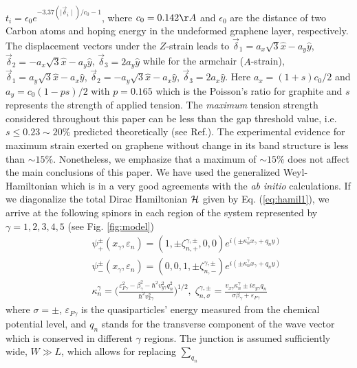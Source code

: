 \documentclass[doublecol]{epl2}
\begin{document}
$t_{i}=\epsilon_{0}e^{-3.37(\mid\vec{\delta}_{i}\mid)/c_{0}-1}$, where $c_0=0.142 {\AA}$ and $\epsilon_{0}$
are the distance of two Carbon atoms and hoping energy in the undeformed graphene layer, respectively. The
displacement vectors under the $Z$-strain leads to $\vec{\delta}_1=a_{x}\sqrt{3}\hat{x}-a_{y}\hat{y}$,
$\vec{\delta}_2=-a_{x}\sqrt{3}\hat{x}-a_{y}\hat{y}$, $\vec{\delta}_3=2a_{y}\hat{y}$ while for the armchair
($A$-strain), $\vec{\delta}_1=a_{y}\sqrt{3}\hat{x}-a_{x}\hat{y}$,
$\vec{\delta}_2=-a_{y}\sqrt{3}\hat{x}-a_{x}\hat{y}$, $\vec{\delta}_3=2a_{x}\hat{y}$. Here $a_{x}=(1+ s)c_0 /2$
and $a_{y}=c_0(1- ps)/2$ with $p=0.165$ which is the Poisson's ratio for graphite and $s$ represents the
strength of applied tension. The {\it maximum} tension strength considered throughout this paper can be less
than the gap threshold value, i.e. $s\leq0.23\sim 20\%$ predicted theoretically (see
Ref.\cite{cite:Pereira,liuprb2007}). The experimental evidence for maximum strain exerted on graphene without
change in its band structure is less than $\sim 15\%$\cite{Lee08}. Nonetheless, we emphasize that a maximum of
$\sim 15\%$ does not affect the main conclusions of this paper. We have used the generalized Weyl-Hamiltonian
which is in a very good agreements with the \textit{ab initio} calculations. If we diagonalize the total Dirac
Hamiltonian ${\cal H}$ given by Eq. (\ref{eq:hamil1}), we arrive at the following spinors in each region of
the system represented by $\gamma=1,2,3,4,5$ (see Fig. \ref{fig:model})
\begin{eqnarray}
&&\psi_{+}^{\pm}(x_\gamma,\varepsilon_n)=(1,\pm\zeta_{n,+}^{\gamma,\pm},0,0)
e^{i(\pm\kappa_{n}^{\gamma}x_\gamma+q_ny)}
\\&&
\psi_{-}^{\pm}(x_\gamma,\varepsilon_n)=(0,0,1,\pm\zeta_{n,-}^{\gamma,\pm})
e^{i(\pm\kappa_{n}^{\gamma}x_\gamma+q_ny)}\\
&&\kappa^\gamma_n=\Big(\frac{\varepsilon_{F\gamma}^2-\beta_\gamma^2-\hbar^2
v_{y\gamma}^2q_n^2}{\hbar^2 v_{x\gamma}^2}\Big)^{1/2},\;
\zeta_{n,\sigma}^{\gamma,\pm}=\frac{v_{x\gamma}\kappa^\gamma_n\pm i v_{y\gamma}q_n}
{\sigma\beta_\gamma+\varepsilon_{F\gamma}}
\nonumber
\end{eqnarray}
where $\sigma=\pm$, $\varepsilon_{F\gamma}$ is the quasiparticles' energy measured from the chemical potential
level, and $q_n$ stands for the transverse component of the wave vector which is conserved in different
$\gamma$ regions. The junction is assumed sufficiently wide, $W\gg L$, which allows for replacing $\sum_{q_n}$
\end{document}
